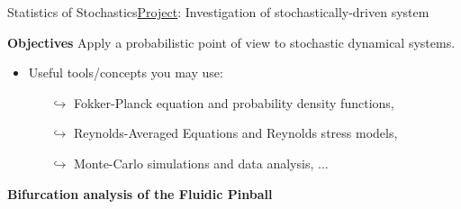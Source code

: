 \documentclass[usenames,dvipsnames,svgnames,10pt,aspectratio=169]{beamer}
\begin{document}
\begin{frame}[t, c]{Statistics of Stochastics}{\underline{Project}: Investigation of stochastically-driven system}

	\begin{block}{\centering \textbf{Objectives}}
		\centering
		Apply a probabilistic point of view to stochastic dynamical systems.
	\end{block}

	\bigskip

	\begin{itemize}
		\item Useful tools/concepts you may use:
		\begin{itemize}
			\item[$\hookrightarrow$] Fokker-Planck equation and probability density functions,
			\item[$\hookrightarrow$] Reynolds-Averaged Equations and Reynolds stress models,
			\item[$\hookrightarrow$] Monte-Carlo simulations and data analysis, ...
		\end{itemize}
	\end{itemize}

	\vspace{1cm}
\end{frame}





\begin{frame}[t, c]{}
	\centering
	\vspace{1cm}

	{\Large \textbf{Bifurcation analysis of the Fluidic Pinball}}

	\bigskip

	{}

\end{frame}
\end{document}
